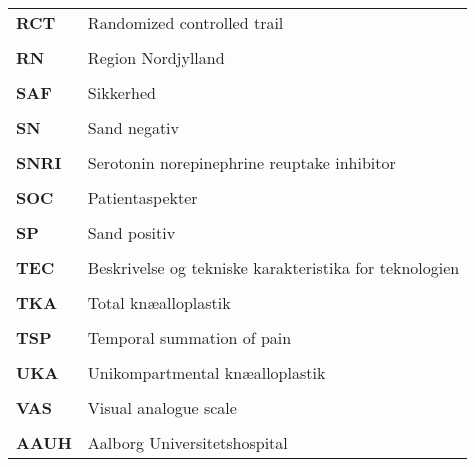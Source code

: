 \begin{longtable}{p{}  p{}}
\textbf{RCT} & Randomized controlled trail
\\ \\
\textbf{RN}  & Region Nordjylland                                             
\\ \\
\textbf{SAF} & Sikkerhed                                                
\\ \\
\textbf{SN}  & Sand negativ                                            
\\ \\
\textbf{SNRI}& Serotonin norepinephrine reuptake inhibitor              
\\ \\
\textbf{SOC} & Patientaspekter                             
\\ \\
\textbf{SP}  & Sand positiv                                          
\\ \\
\textbf{TEC} & Beskrivelse og tekniske karakteristika for teknologien   
\\ \\
\textbf{TKA} & Total knæalloplastik                                     
\\ \\
\textbf{TSP} & Temporal summation of pain                               
\\ \\
\textbf{UKA} & Unikompartmental knæalloplastik                          
\\ \\
\textbf{VAS} & Visual analogue scale
\\ \\
\textbf{AAUH}& Aalborg Universitetshospital                             
\end{longtable}
